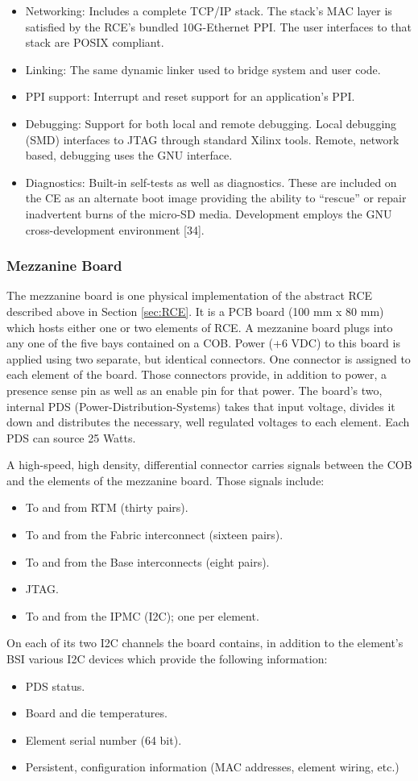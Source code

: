\begin{itemize}
\item Networking: Includes a complete TCP/IP stack. The stack's MAC layer is satisfied by the RCE's bundled 10G-Ethernet PPI. The user interfaces to that stack are POSIX compliant.
\item Linking: The same dynamic linker used to bridge system and user code.
\item PPI support: Interrupt and reset support for an application's PPI.
\item Debugging: Support for both local and remote debugging. Local debugging (SMD) interfaces to JTAG through standard Xilinx tools. Remote, network based, debugging uses the GNU interface.
\item Diagnostics: Built-in self-tests as well as diagnostics. These are included on the CE as an alternate boot image providing the ability to “rescue” or repair inadvertent burns of the micro-SD media.  Development employs the GNU cross-development environment [34].
\end{itemize}

\subsubsection{Mezzanine Board}
\label{sec:Mezzanine}
The mezzanine board is one physical implementation of the abstract RCE described above in Section \ref{sec:RCE}. It is a PCB board (100 mm x 80 mm) which hosts either one or two elements of RCE. A mezzanine board plugs into any one of the five bays contained on a COB.
Power (+6 VDC) to this board is applied using two separate, but identical connectors. One connector is assigned to each element of the board. Those connectors provide, in addition to power, a presence sense pin as well as an enable pin for that power. The board's two, internal PDS (Power-Distribution-Systems) takes that input voltage, divides it down and distributes the necessary, well regulated voltages to each element. Each PDS can source 25 Watts.

A high-speed, high density, differential connector carries signals between the COB and the elements of the mezzanine board. Those signals include:
\begin{itemize}
\item  To and from RTM (thirty pairs).
\item To and from the Fabric interconnect (sixteen pairs).
\item To and from the Base interconnects (eight pairs).
\item JTAG.
\item To and from the IPMC (I2C); one per element.
\end{itemize}
On each of its two I2C channels the board contains, in addition to the element's BSI  various I2C devices which provide the following information:
\begin{itemize}
\item PDS status.
\item Board and die temperatures.
\item Element serial number (64 bit).
\item Persistent, configuration information (MAC addresses, element wiring, etc.)
\end{itemize}

